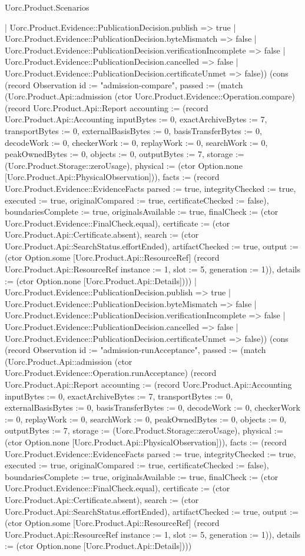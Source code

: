 \begin{lexlean}{Uorc.Product.Scenarios}
\begin{semanticmodule}
{{    | Uorc.Product.Evidence::PublicationDecision.publish => true
    | Uorc.Product.Evidence::PublicationDecision.byteMismatch => false
    | Uorc.Product.Evidence::PublicationDecision.verificationIncomplete => false
    | Uorc.Product.Evidence::PublicationDecision.cancelled => false
    | Uorc.Product.Evidence::PublicationDecision.certificateUnmet => false)}) (cons (record Observation {id := "admission-compare", passed := (match (Uorc.Product.Api::admission (ctor Uorc.Product.Evidence::Operation.compare) (record Uorc.Product.Api::Report {accounting := (record Uorc.Product.Api::Accounting {inputBytes := 0, exactArchiveBytes := 7, transportBytes := 0, externalBasisBytes := 0, basisTransferBytes := 0, decodeWork := 0, checkerWork := 0, replayWork := 0, searchWork := 0, peakOwnedBytes := 0, objects := 0, outputBytes := 7, storage := (Uorc.Product.Storage::zeroUsage), physical := (ctor Option.none [Uorc.Product.Api::PhysicalObservation])}), facts := (record Uorc.Product.Evidence::EvidenceFacts {parsed := true, integrityChecked := true, executed := true, originalCompared := true, certificateChecked := false}), boundariesComplete := true, originalsAvailable := true, finalCheck := (ctor Uorc.Product.Evidence::FinalCheck.equal), certificate := (ctor Uorc.Product.Api::Certificate.absent), search := (ctor Uorc.Product.Api::SearchStatus.effortEnded), artifactChecked := true, output := (ctor Option.some [Uorc.Product.Api::ResourceRef] (record Uorc.Product.Api::ResourceRef {instance := 1, slot := 5, generation := 1})), details := (ctor Option.none [Uorc.Product.Api::Details])}))
    | Uorc.Product.Evidence::PublicationDecision.publish => true
    | Uorc.Product.Evidence::PublicationDecision.byteMismatch => false
    | Uorc.Product.Evidence::PublicationDecision.verificationIncomplete => false
    | Uorc.Product.Evidence::PublicationDecision.cancelled => false
    | Uorc.Product.Evidence::PublicationDecision.certificateUnmet => false)}) (cons (record Observation {id := "admission-runAcceptance", passed := (match (Uorc.Product.Api::admission (ctor Uorc.Product.Evidence::Operation.runAcceptance) (record Uorc.Product.Api::Report {accounting := (record Uorc.Product.Api::Accounting {inputBytes := 0, exactArchiveBytes := 7, transportBytes := 0, externalBasisBytes := 0, basisTransferBytes := 0, decodeWork := 0, checkerWork := 0, replayWork := 0, searchWork := 0, peakOwnedBytes := 0, objects := 0, outputBytes := 7, storage := (Uorc.Product.Storage::zeroUsage), physical := (ctor Option.none [Uorc.Product.Api::PhysicalObservation])}), facts := (record Uorc.Product.Evidence::EvidenceFacts {parsed := true, integrityChecked := true, executed := true, originalCompared := true, certificateChecked := false}), boundariesComplete := true, originalsAvailable := true, finalCheck := (ctor Uorc.Product.Evidence::FinalCheck.equal), certificate := (ctor Uorc.Product.Api::Certificate.absent), search := (ctor Uorc.Product.Api::SearchStatus.effortEnded), artifactChecked := true, output := (ctor Option.some [Uorc.Product.Api::ResourceRef] (record Uorc.Product.Api::ResourceRef {instance := 1, slot := 5, generation := 1})), details := (ctor Option.none [Uorc.Product.Api::Details])}))
}}
\end{semanticmodule}
\end{lexlean}
